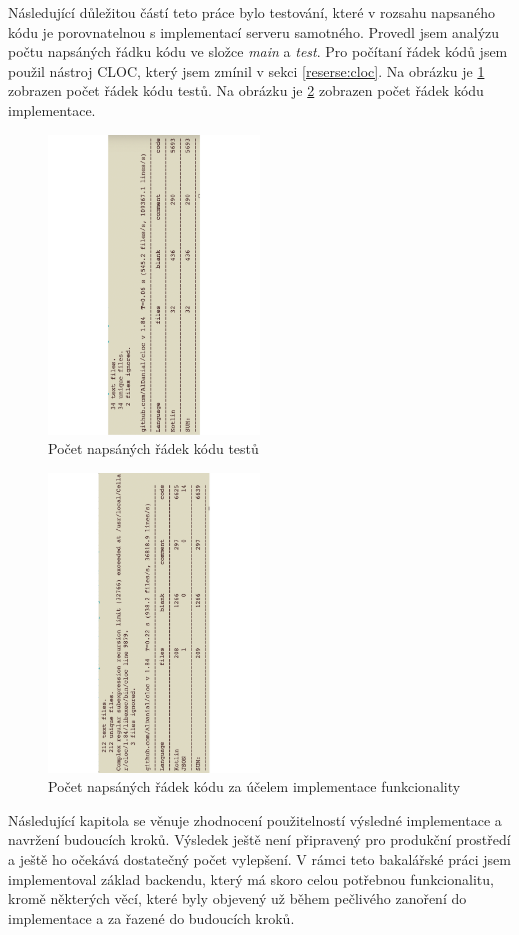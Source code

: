  Následující důležitou částí teto práce bylo testování, které v rozsahu napsaného kódu je porovnatelnou s implementací serveru samotného. Provedl jsem analýzu počtu napsáných řádku kódu ve složce \textit{main} a \textit{test}. Pro počítaní řádek kódů jsem použil nástroj CLOC, který jsem zmínil v sekci \ref{reserse:cloc}. Na obrázku je \ref{image:code-count-test} zobrazen počet řádek kódu testů. Na obrázku je \ref{image:code-count-main} zobrazen počet řádek kódu implementace.
 \begin{figure}\centering
	   \includegraphics[angle=-90, width=0.5\textwidth]{pdfs/CodeAmountTests2}
	   \caption[Analýza kódu testů]{Počet napsáných řádek kódu testů}\label{image:code-count-test}
\end{figure}
 \begin{figure}\centering
	   \includegraphics[angle=-90, width=0.5\textwidth]{pdfs/CodeAmountImpl2}
	   \caption[Analýza kódu implementace]{Počet napsáných řádek kódu za účelem implementace funkcionality}\label{image:code-count-main}
\end{figure}

Následující kapitola se věnuje zhodnocení použitelností výsledné implementace a navržení budoucích kroků. Výsledek ještě není připravený pro produkční prostředí a ještě ho očekává dostatečný počet vylepšení. V rámci teto bakalářské práci jsem implementoval základ backendu, který má skoro celou potřebnou funkcionalitu, kromě některých věcí, které byly objevený už během pečlivého zanoření do implementace a za
řazené do budoucích kroků.